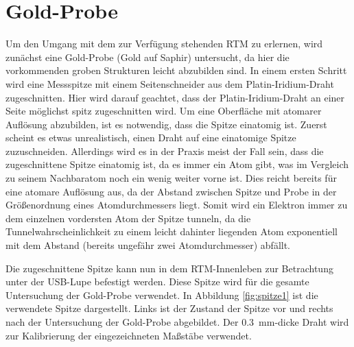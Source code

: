 \section{Gold-Probe}\label{sec:gold}
Um den Umgang mit dem zur Verfügung stehenden RTM zu erlernen, wird zunächst eine Gold-Probe (Gold auf Saphir) untersucht, da hier die vorkommenden groben Strukturen leicht
abzubilden sind. In einem ersten Schritt wird eine Messspitze mit einem Seitenschneider aus dem Platin-Iridium-Draht zugeschnitten. Hier wird darauf geachtet,
dass der Platin-Iridium-Draht an einer Seite möglichst spitz zugeschnitten wird. Um eine Oberfläche mit atomarer Auflösung abzubilden, ist es notwendig, dass
die Spitze einatomig ist. Zuerst scheint es etwas unrealistisch, einen Draht auf eine einatomige Spitze zuzuschneiden. Allerdings wird es in der Praxis
meist der Fall sein, dass die zugeschnittene Spitze einatomig ist, da es immer ein Atom gibt, was im Vergleich zu seinem Nachbaratom noch ein wenig weiter vorne ist.
Dies reicht bereits für eine atomare Auflösung aus, da der Abstand zwischen Spitze und Probe in der Größenordnung eines Atomdurchmessers liegt. Somit wird
ein Elektron immer zu dem einzelnen vordersten Atom der Spitze tunneln, da die Tunnelwahrscheinlichkeit zu einem leicht dahinter liegenden Atom exponentiell
mit dem Abstand (bereits ungefähr zwei Atomdurchmesser) abfällt.\par
Die zugeschnittene Spitze kann nun in dem RTM-Innenleben zur Betrachtung unter der USB-Lupe befestigt werden. Diese Spitze wird für die gesamte Untersuchung
der Gold-Probe verwendet. In Abbildung \cref{fig:spitze1} ist die verwendete Spitze dargestellt. Links ist der Zustand der Spitze vor und rechts nach der Untersuchung
der Gold-Probe abgebildet. Der \SI{0,3}{\milli \meter}-dicke Draht wird zur Kalibrierung der eingezeichneten Maßstäbe verwendet.
